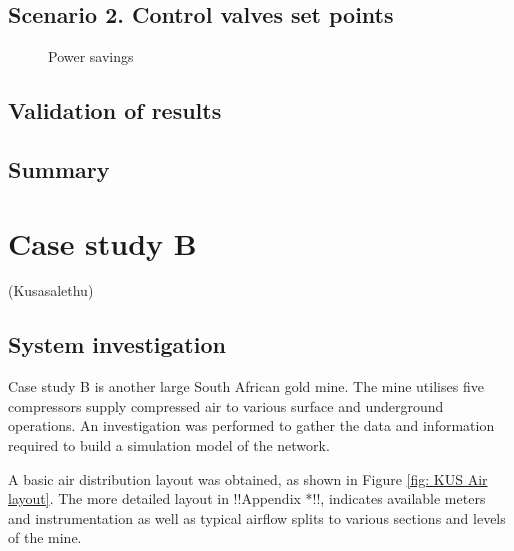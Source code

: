 \subsection{Scenario 2. Control valves set points}

\begin{figure}[h!]
	\centering
	\fbox{}
	\caption{Power savings}
	\label{fig: Control Valve Results Beatrix}
\end{figure}
\subsection{Validation of results}
\subsection{Summary}
\newpage
\section{Case study B }
{\color{blue}(Kusasalethu)}
	\subsection{System investigation}
	Case study B is another large South African gold mine. The mine utilises five compressors supply compressed air to various surface and underground operations. An investigation was performed to gather the data and information required to build a simulation model of the network.
	\par 
	A basic air distribution layout was obtained, as shown in Figure \ref{fig: KUS Air layout}.  The more detailed layout in !!Appendix *!!,  indicates available meters and instrumentation as well as typical airflow splits to various sections and levels of the mine.
	\par 
	
